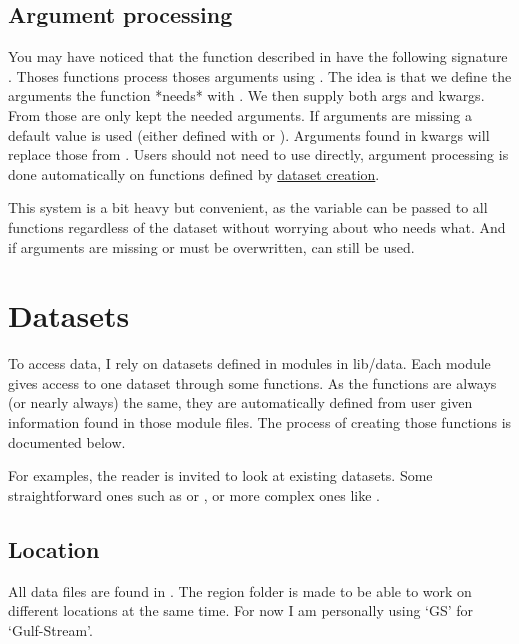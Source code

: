\subsection{Argument processing}
\label{sec:org-arg-processing}

You may have noticed that the function described in  have the following signature .
Thoses functions process thoses arguments using .
The idea is that we define the arguments the function *needs* with .
We then supply both args and kwargs. From those are only kept the needed arguments.
If arguments are missing a default value is used (either defined with  or ).
Arguments found in kwargs will replace those from .
Users should not need to use  directly, argument processing is done automatically on functions defined by \hyperref[sec:org-datasets]{dataset creation}.

This system is a bit heavy but convenient, as the variable  can be passed to all functions regardless of the dataset without worrying about who needs what. And if arguments are missing or must be overwritten,  can still be used.

\section{Datasets}
\label{sec:org-datasets}

To access data, I rely on datasets defined in modules in lib/data.
Each module gives access to one dataset through some functions.
As the functions are always (or nearly always) the same, they are automatically defined from user given information found in those module files. The process of creating those functions is documented below.

For examples, the reader is invited to look at existing datasets.
Some straightforward ones such as  or , or more complex ones like .

\subsection{Location}
All data files are found in .
The region folder is made to be able to work on different locations at the same time.
For now I am personally using `GS' for `Gulf-Stream'.

